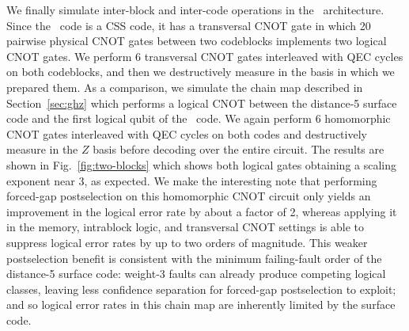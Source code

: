 We finally simulate inter-block and inter-code operations in the \chelix\ architecture. Since the \chelix\ code is a CSS code, it has a transversal CNOT gate in which 20 pairwise physical CNOT gates between two codeblocks implements two logical CNOT gates. We perform 6 transversal CNOT gates interleaved with QEC cycles on both codeblocks, and then we destructively measure in the basis in which we prepared them. As a comparison, we simulate the chain map described in Section~\ref{sec:ghz} which performs a logical CNOT between the distance-5 surface code and the first logical qubit of the \chelix\ code. We again perform 6 homomorphic CNOT gates interleaved with QEC cycles on both codes and destructively measure in the $Z$ basis before decoding over the entire circuit. The results are shown in Fig.~\ref{fig:two-blocks} which shows both logical gates obtaining a scaling exponent near 3, as expected. We make the interesting note that performing forced-gap postselection on this homomorphic CNOT circuit only yields an improvement in the logical error rate by about a factor of 2, whereas applying it in the memory, intrablock logic, and transversal CNOT settings is able to suppress logical error rates by up to two orders of magnitude. This weaker postselection benefit is consistent with the minimum failing-fault order of the distance-5 surface code: weight-3 faults can already produce competing logical classes, leaving less confidence separation for forced-gap postselection to exploit; and so logical error rates in this chain map are inherently limited by the surface code. 

% 